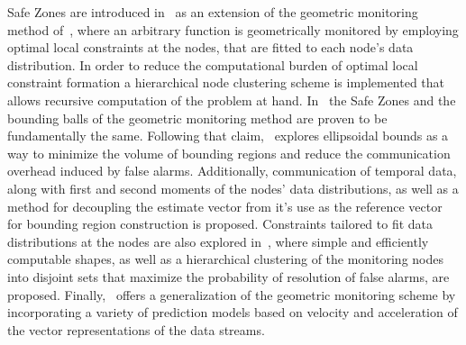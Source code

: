 Safe Zones are introduced in~\cite{Keren2013SafeZones} as an extension of the geometric monitoring method of~\cite{Sharfman2006GM},
where an arbitrary function is geometrically monitored by employing optimal local constraints at the nodes, that are fitted to each node's data distribution. In order to reduce the computational burden of optimal local constraint formation a hierarchical node clustering scheme is implemented that allows recursive computation of the problem at hand. In~\cite{Samoladas2013Unification} the Safe Zones and the bounding balls of the geometric monitoring method are proven to be fundamentally the same. Following that claim,~\cite{Sharfman2012ShapeSensGM} explores ellipsoidal bounds as a way to minimize the volume of bounding regions and reduce the communication overhead induced by false alarms. Additionally, communication of temporal data, along with first and second moments of the nodes' data distributions, as well as a method for decoupling the estimate vector from it's use as the reference vector for bounding region construction is proposed. Constraints tailored to fit data distributions at the nodes are also explored in~\cite{Keren2014GMHetStreams}, where simple and efficiently computable shapes, as well as a hierarchical clustering of the monitoring nodes into disjoint sets that maximize the probability of resolution of false alarms, are proposed. Finally,~\cite{GiatrakosPredictionGM} offers a generalization of the geometric monitoring scheme by incorporating a variety of prediction models based on velocity and acceleration of the vector representations of the data streams.

